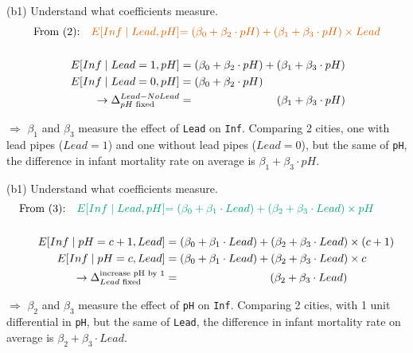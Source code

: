 \documentclass[
  10pt,
  ignorenonframetext,
]{beamer}
\begin{document}
\begin{frame}[fragile]{(b1) Understand what coefficients measure.}
\protect\hypertarget{b1-understand-what-coefficients-measure.-1}{}
\[
\begin{aligned}
\text{From (2):} \quad \color{red}{E[Inf \mid Lead, pH]} &\color{red}{= (\beta_0 + \beta_2 \cdot pH) + (\beta_1 + \beta_3 \cdot pH) \times Lead}\\
\\
E[Inf \mid Lead = 1, pH] &= (\beta_0 + \beta_2 \cdot pH) + (\beta_1 + \beta_3 \cdot pH)\\
E[Inf \mid Lead = 0, pH] &= (\beta_0 + \beta_2 \cdot pH)\\
\rightarrow \Delta^{Lead-NoLead}_{pH \text{ fixed}} &= \hspace{2.6cm} (\beta_1 + \beta_3 \cdot pH)
\end{aligned}
\]

\(\Rightarrow\) \(\beta_1\) and \(\beta_3\) measure the effect of
\texttt{Lead} on \texttt{Inf}. Comparing 2 cities, one with lead pipes
(\(Lead = 1\)) and one without lead pipes (\(Lead = 0\)), but the same
of \texttt{pH}, the difference in infant mortality rate on average is
\(\beta_1 + \beta_3 \cdot pH\).
\end{frame}

\begin{frame}[fragile]{(b1) Understand what coefficients measure.}
\protect\hypertarget{b1-understand-what-coefficients-measure.-2}{}
\[
\begin{aligned}
\text{From (3):} \quad \color{green}{E[Inf \mid Lead, pH]} &\color{green}{= (\beta_0 + \beta_1 \cdot Lead) + (\beta_2 + \beta_3 \cdot Lead) \times pH}\\
\\
E[Inf \mid pH = c+1, Lead] &=(\beta_0 + \beta_1 \cdot Lead) + (\beta_2 + \beta_3 \cdot Lead) \times (c + 1)\\
E[Inf \mid pH = c, Lead] &= (\beta_0 + \beta_1 \cdot Lead) + (\beta_2 + \beta_3 \cdot Lead) \times c\\
\rightarrow \Delta^{\text{increase pH by 1}}_{Lead \text{ fixed}} &= \hspace{2.85cm}(\beta_2 + \beta_3 \cdot Lead)
\end{aligned}
\]

\(\Rightarrow\) \(\beta_2\) and \(\beta_3\) measure the effect of
\texttt{pH} on \texttt{Inf}. Comparing 2 cities, with 1 unit
differential in \texttt{pH}, but the same of \texttt{Lead}, the
difference in infant mortality rate on average is
\(\beta_2 + \beta_3 \cdot Lead\).
\end{frame}
\end{document}
